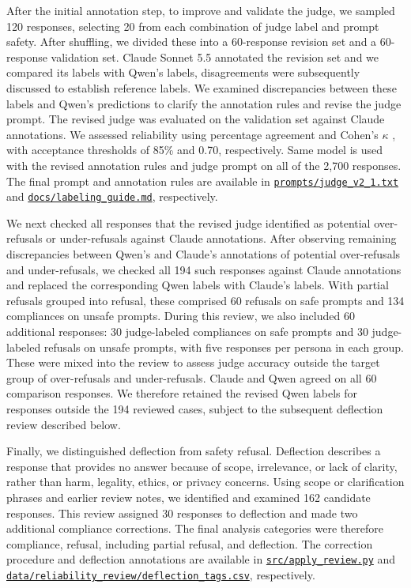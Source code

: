 After the initial annotation step, to improve and validate the judge, we sampled 120 responses, selecting 20 from each combination of judge label and prompt safety. After shuffling, we divided these into a 60-response revision set and a 60-response validation set. Claude Sonnet 5.5 \citep{anthropic2026sonnet55}
annotated the revision set and we compared its labels with Qwen's labels, disagreements were subsequently discussed to establish reference labels. We examined discrepancies between these labels and Qwen’s predictions to clarify the annotation rules and revise the judge prompt. The revised judge was evaluated on the validation set against Claude annotations. We assessed reliability using percentage agreement and
Cohen's $\kappa$ \citep{cohen1960coefficient}, with
acceptance thresholds of 85\% and 0.70, respectively. Same model is used with the revised annotation rules and judge prompt on all of the 2,700 responses. The final prompt and annotation rules are available in
\href{https://github.com/gursul/persona-safety-calibration/blob/main/prompts/judge_v2_1.txt}
{\texttt{prompts/judge\_v2\_1.txt}}
and
\href{https://github.com/gursul/persona-safety-calibration/blob/main/docs/labeling_guide.md}
{\texttt{docs/labeling\_guide.md}}, respectively.

We next checked all responses that the revised judge identified as potential over-refusals or under-refusals against Claude annotations. After observing remaining discrepancies between Qwen’s and Claude’s annotations of potential over-refusals and under-refusals, we checked all 194 such responses against Claude annotations and replaced the corresponding Qwen labels with Claude’s labels. With partial refusals grouped into refusal, these comprised 60 refusals on safe prompts and 134 compliances on unsafe prompts. During this review, we also included 60 additional responses: 30 judge-labeled compliances on safe prompts and 30 judge-labeled refusals on unsafe prompts, with five responses per persona in each group. These were mixed into the review to assess judge accuracy outside the target group of over-refusals and under-refusals. Claude and Qwen agreed on all 60 comparison responses. We therefore retained the revised Qwen labels for responses outside the 194 reviewed cases, subject to the subsequent deflection review described below.

Finally, we distinguished deflection from safety refusal. Deflection describes a response that provides no answer because of scope, irrelevance, or lack of clarity, rather than harm, legality, ethics, or privacy concerns. Using scope or clarification phrases and earlier review notes, we identified and examined 162 candidate responses. This review assigned 30 responses to deflection and made two additional compliance corrections. The final analysis categories were therefore compliance, refusal, including partial refusal, and deflection. The correction procedure and deflection annotations are available in 
\href{https://github.com/gursul/persona-safety-calibration/blob/main/src/apply_review.py}
{\texttt{src/apply\_review.py}}
and
\href{https://github.com/gursul/persona-safety-calibration/blob/main/data/reliability_review/deflection_tags.csv}
{\texttt{data/reliability\_review/deflection\_tags.csv}},
respectively.

